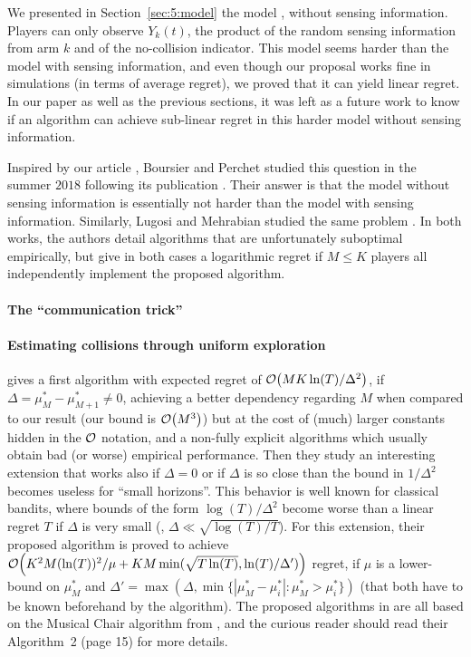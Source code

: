 We presented in Section~\ref{sec:5:model} the model \modeltrois, without sensing information. Players can only observe $Y_k(t)$, the product of the \iid{} random sensing information from arm $k$ and of the no-collision indicator.
This model seems harder than the model with sensing information, and even though our proposal \Selfish{} works fine in simulations (in terms of average regret), we proved that it can yield linear regret.
In our paper \cite{Besson2018ALT} as well as the previous sections, it was left as a future work to know if an algorithm can achieve sub-linear regret in this harder model without sensing information.

Inspired by our article \cite{Besson2018ALT},
Boursier and Perchet studied this question in the summer $2018$ following its publication \cite{BoursierPerchet18}.
Their answer is that the model without sensing information is essentially not harder than the model with sensing information.
%
Similarly, Lugosi and Mehrabian studied the same problem \cite{LugosiMehrabian18}.
In both works, the authors detail algorithms that are unfortunately suboptimal empirically, but give in both cases a logarithmic regret if $M \leq K$ players all independently implement the proposed algorithm.

\paragraph{The ``communication trick''}
%


\paragraph{Estimating collisions through uniform exploration}
%
\cite{LugosiMehrabian18} gives a first algorithm with expected regret of $\mathop{}\mathopen{}\mathcal{O}\mathopen{}\left(M K \ln(T) / \Delta^2\right)$, if $\Delta = \mu^*_{M} - \mu^*_{M+1} \neq 0$, achieving a better dependency regarding $M$ when compared to our result (our bound is $\mathop{}\mathopen{}\mathcal{O}\mathopen{}\left(M^3\right)$) but at the cost of (much) larger constants hidden in the $\mathcal{O}$ notation, and a non-fully explicit algorithms which usually obtain bad (or worse) empirical performance.
Then they study an interesting extension that works also if $\Delta = 0$ or if $\Delta$ is so close than the bound in $1/\Delta^2$ becomes useless for ``small horizons''. This behavior is well known for classical bandits, where bounds of the form $\log(T)/\Delta^2$ become worse than a linear regret $T$ if $\Delta$ is very small (\ie, $\Delta\ll \sqrt{\log(T)/T}$).
For this extension, their proposed algorithm is proved to achieve $\mathop{}\mathopen{}\mathcal{O}\mathopen{}\left(K^2 M (\ln(T))^2 / \mu + K M \min(\sqrt{T \ln(T)}, \ln(T)/\Delta')\right)$ regret, if $\mu$ is a lower-bound on $\mu^*_{M}$ and $\Delta' = \max(\Delta, \min\{|\mu^*_M-\mu^*_i| : \mu^*_M > \mu^*_i \})$ (that both have to be known beforehand by the algorithm).
%
The proposed algorithms in \cite{LugosiMehrabian18} are all based on the Musical Chair algorithm from \cite{Rosenski16}, and the curious reader should read their Algorithm~2 (page 15) for more details.

